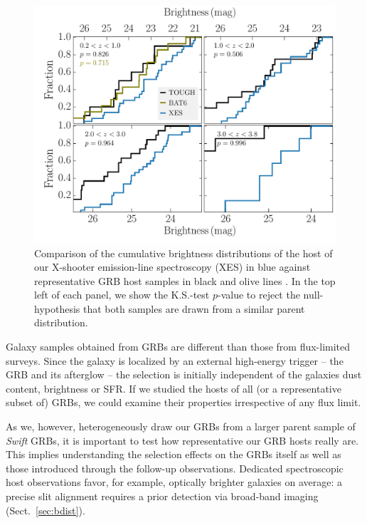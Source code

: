 \documentclass[traditabstract, longauth]{aa}
\begin{document}
\begin{figure}
\includegraphics[angle=0, width=0.99\columnwidth]{Figs/Bdist.pdf}
\caption{Comparison of the cumulative brightness distributions of the host of our X-shooter emission-line spectroscopy (XES) in blue against representative GRB host samples in black and olive lines \citep{2012ApJ...756..187H, 2014arXiv1409.7064V}. In the top left of each panel, we show the K.S.-test $p$-value to reject the null-hypothesis that both samples are drawn from a similar parent distribution.}
\label{fig:selection}
\end{figure}

 {Galaxy samples obtained from GRBs are different than those from flux-limited surveys. Since the galaxy is localized by an external high-energy trigger -- the GRB and its afterglow -- the selection is initially independent of the galaxies dust content, brightness or SFR. If we studied the hosts of all (or a representative subset of) GRBs, we could examine their properties irrespective of any flux limit.}

 {As we, however, heterogeneously draw our GRBs from a larger parent sample of \textit{Swift} GRBs, it is important to test how representative our GRB hosts really are. This implies understanding the selection effects on the GRBs itself as well as those introduced through the follow-up observations. Dedicated spectroscopic host observations favor, for example, optically brighter galaxies on average: a precise slit alignment requires a prior detection via broad-band imaging (Sect.~\ref{sec:bdist}).}
\end{document}
